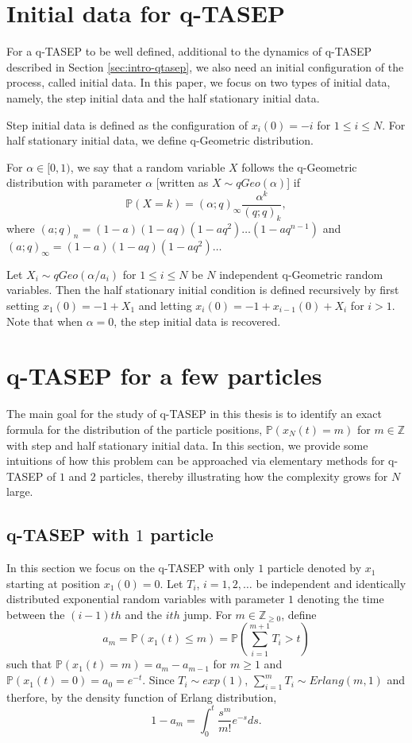 \section{Initial data for q-TASEP}
For a q-TASEP to be well defined, additional to the dynamics of q-TASEP described in Section \ref{sec:intro-qtasep}, we also need an initial configuration of the process, called initial data. In this paper, we focus on two types of initial data, namely, the step initial data and the half stationary initial data. 

Step initial data is defined as the configuration of $x_i(0) = -i$ for $1 \le i \le N$. For half stationary initial data, we define q-Geometric distribution. 

\begin{definition}
\label{def:qgeo}
For $\alpha \in [0,1)$, we say that a random variable $X$ follows the q-Geometric distribution with parameter $\alpha$ [written as $X \sim qGeo(\alpha)$] if $$\mathbb{P}(X = k) = (\alpha;q)_{\infty} \frac{\alpha^k}{(q;q)_k},$$ where $(a;q)_n = (1-a)(1-aq)(1-aq^2)\dots(1-aq^{n-1})$ and $(a;q)_{\infty} = (1-a)(1-aq)(1-aq^2)\dots$
\end{definition}

Let $X_i \sim qGeo(\alpha/a_i)$ for $1 \le i \le N$ be $N$ independent q-Geometric random variables. Then the half stationary initial condition is defined recursively by first setting $x_1(0) = -1 + X_1$ and letting $x_i(0) = -1 + x_{i-1}(0) + X_i$ for $i > 1$. Note that when $\alpha = 0$, the step initial data is recovered.

\section{q-TASEP for a few particles}
The main goal for the study of q-TASEP in this thesis is to identify an exact formula for the distribution of the particle positions, $\mathbb{P}(x_N(t) = m)$ for $m \in \mathbb{Z}$ with step and half stationary initial data. In this section, we provide some intuitions of how this problem can be approached via elementary methods for q-TASEP of $1$ and $2$ particles, thereby illustrating how the complexity grows for $N$ large. 

\subsection{q-TASEP with $1$ particle}
In this section we focus on the q-TASEP with only $1$ particle denoted by $x_1$ starting at position $x_1(0) = 0$. Let $T_i$, $i = 1,2,\dots$ be independent and identically distributed exponential random variables with parameter $1$ denoting the time between the $(i-1)th$ and the $ith$ jump. For $m \in \mathbb{Z}_{\ge 0}$, define $$a_m = \mathbb{P}(x_1(t) \le m) = \mathbb{P}(\sum_{i=1}^{m+1} T_i > t)$$ such that $\mathbb{P}(x_1(t) = m) = a_m - a_{m-1}$ for $m \ge 1$ and $\mathbb{P}(x_1(t) = 0) = a_0 = e^{-t}$. Since $T_i \sim exp(1)$, $\sum_{i=1}^{m} T_i \sim Erlang(m,1)$ and therfore, by the density function of Erlang distribution, $$1 - a_m = \int_0^t \frac{s^m}{m!} e^{-s} ds.$$ 


